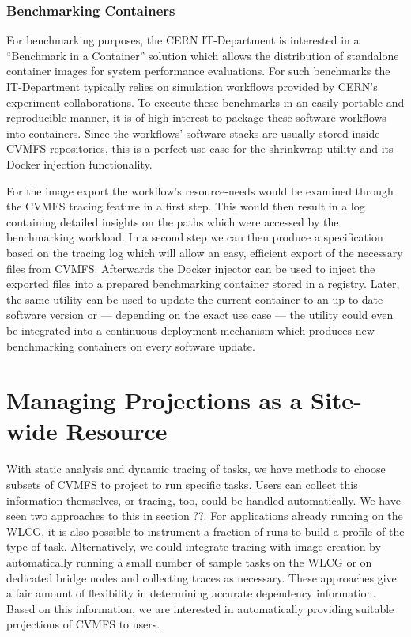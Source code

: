 \documentclass[sigconf]{acmart}
\begin{document}
\subsubsection{Benchmarking Containers}
For benchmarking purposes, the CERN IT-Department is interested in a ``Benchmark in a Container'' solution which allows the distribution of standalone container images for system performance evaluations. For such benchmarks the IT-Department typically relies on simulation workflows provided by CERN's experiment collaborations. To execute these benchmarks in an easily portable and reproducible manner, it is of high interest to package these software workflows into containers. Since the workflows' software stacks are usually stored inside CVMFS repositories, this is a perfect use case for the shrinkwrap utility and its Docker injection functionality.

For the image export the workflow’s resource-needs would be examined through the CVMFS tracing feature in a first step. This would then result in a log containing detailed insights on the paths which were accessed by the benchmarking workload. In a second step we can then produce a specification based on the tracing log which will allow an easy, efficient export of the necessary files from CVMFS. Afterwards the Docker injector can be used to inject the exported files into a prepared benchmarking container stored in a registry. Later, the same utility can be used to update the current container to an up-to-date software version or — depending on the exact use case — the utility could even be integrated into a continuous deployment mechanism which produces new benchmarking containers on every software update.

\section{Managing Projections as a Site-wide Resource}

With static analysis and dynamic tracing of tasks,
we have methods to choose subsets of CVMFS to project to run specific tasks.
Users can collect this information themselves,
or tracing, too, could be handled automatically.
We have seen two approaches to this in section ??.
For applications already running on the WLCG,
it is also possible to instrument a fraction of runs to build a profile of the type of task.
Alternatively, we could integrate tracing with image creation by automatically running a small number of sample tasks on the WLCG or on dedicated bridge nodes and collecting traces as necessary.
These approaches give a fair amount of flexibility in determining accurate dependency information.
Based on this information,
we are interested in automatically providing suitable projections of CVMFS to users.
\end{document}
